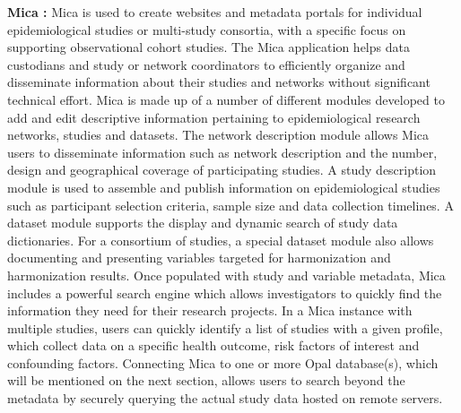 \textbf{Mica \cite{mica}:}
Mica is used to create websites and metadata portals for individual epidemiological
studies or multi-study consortia, with a specific focus on supporting observational
cohort studies.
The Mica application helps data custodians and study or network coordinators to
efficiently organize and disseminate information about their studies and networks
without significant technical effort.
Mica is made up of a number of different modules developed to add and edit descriptive
information pertaining to epidemiological research networks, studies and datasets.
The network description module allows Mica users to disseminate information such as
network description and the number, design and geographical coverage of participating
studies.
A study description module is used to assemble and publish information on
epidemiological studies such as participant selection criteria, sample size and data
collection timelines.
A dataset module supports the display and dynamic search of study data dictionaries.
For a consortium of studies, a special dataset module also allows documenting and
presenting variables targeted for harmonization and harmonization results.
Once populated with study and variable metadata, Mica includes a powerful search engine
which allows investigators to quickly find the information they need for their research
projects.
In a Mica instance with multiple studies, users can quickly identify a list of studies
with a given profile, which collect data on a specific health outcome, risk factors of
interest and confounding factors.
Connecting Mica to one or more Opal database(s), which will be mentioned on the next
section, allows users to search beyond the metadata by securely querying the actual
study data hosted on remote servers.

%
%
%
%
%
%
%
%
%
%

